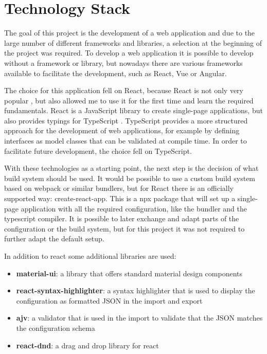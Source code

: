 \chapter{Technology Stack}
\label{sec:tech_stack}
The goal of this project is the development of a web application and due to the large number of different frameworks and libraries, a selection at the beginning of the project was required. To develop a web application it is possible to develop without a framework or library, but nowadays there are various frameworks available to facilitate the development, such as React, Vue or Angular.

The choice for this application fell on React, because React is not only very popular \cite{2020DeveloperSurvey}, but also allowed me to  use it for the first time and learn the required fundamentals. React is a JavaScript library to create single-page applications, but also provides typings for TypeScript \cite{createReactApp}. TypeScript provides a more structured approach for the development of web applications, for example by defining interfaces as model classes that can be validated at compile time. In order to facilitate future development, the choice fell on TypeScript. 

With these technologies as a starting point, the next step is the decision of what build system should be used. It would be possible to use a custom build system based on webpack or similar bundlers, but for React there is an officially supported way: create-react-app. This is a npx package that will set up a single-page application with all the required configuration, like the bundler and the typescript compiler. It is possible to later exchange and adapt parts of the configuration or the build system, but for this project it was not required to further adapt the default setup.

In addition to react some additional libraries are used:

\begin{itemize}
    \item \textbf{material-ui}: a library that offers standard material design components
    \item \textbf{react-syntax-highlighter}: a syntax highlighter that is used to display the configuration as formatted JSON in the import and export 
    \item \textbf{ajv}: a validator that is used in the import to validate that the JSON matches the configuration schema
    \item \textbf{react-dnd}: a drag and drop library for react
\end{itemize}

\newpage